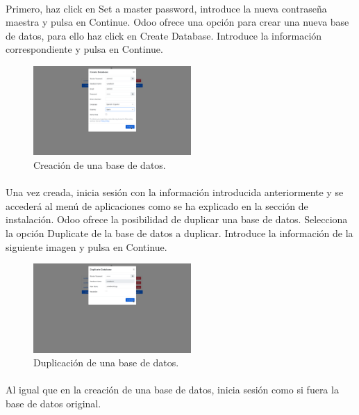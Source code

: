 \documentclass[paper=a4wide, fontsize=11pt]{report}	 %
\begin{document}
\paragraph{}
Primero, haz click en Set a master password, introduce la nueva contraseña maestra y pulsa en Continue. 
Odoo ofrece una opción para crear una nueva base de datos, para ello haz click en Create Database. Introduce la información correspondiente y pulsa en Continue.
\newpage
\begin{figure}[h]
    \centering
    \includegraphics[width=6cm]{crearDb.png}
    \caption{Creación de una base de datos.}
    \label{fig:faqs}
\end{figure}
\paragraph{}
Una vez creada, inicia sesión con la información introducida anteriormente y se accederá al menú de aplicaciones como se ha explicado en la sección de instalación.
Odoo ofrece la posibilidad de duplicar una base de datos. Selecciona la opción Duplicate de la base de datos a duplicar. Introduce la información de la siguiente imagen y pulsa en Continue.
\begin{figure}[h]
    \centering
    \includegraphics[width=6cm]{duplicarDb.png}
    \caption{Duplicación de una base de datos.}
    \label{fig:faqs}
\end{figure}
\paragraph{}
Al igual que en la creación de una base de datos, inicia sesión como si fuera la base de datos original.
\end{document}
